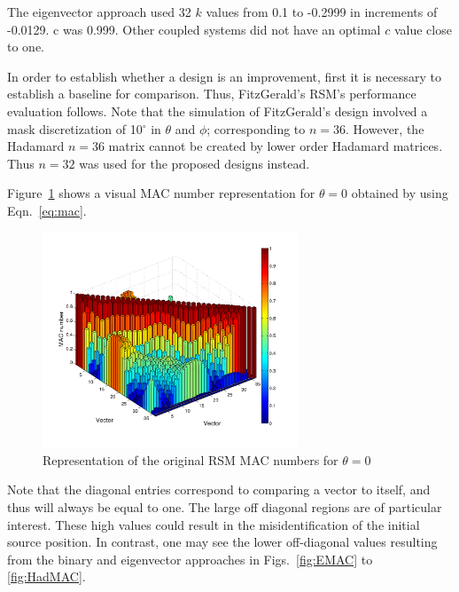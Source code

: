 \documentclass[3p,times]{elsarticle}
\begin{document}
The eigenvector approach used 32 $k$ values from 0.1 to -0.2999 in increments of -0.0129. c was 0.999.  Other coupled systems did not have an optimal 
$c$ value close to one.

In order to establish whether a design is an improvement, first it is necessary to establish a baseline for comparison.  Thus, FitzGerald's RSM's performance evaluation follows.  Note that the 
simulation of FitzGerald's design involved a mask discretization of 10$^\circ$ in $\theta$ and $\phi$; corresponding to $n=36$.  However, the Hadamard $n=36$
matrix cannot be created by lower order Hadamard matrices\cite{Weisstein}.  Thus $n=32$ was used for the proposed designs instead.

Figure~\ref{fig:RSMMAC} shows a visual MAC number representation for $\theta=0$ obtained by using Eqn.~\ref{eq:mac}.  
\begin{figure}[ht!]
\includegraphics[width={3.0in}]{../figs/RSMMAC.pdf}
\centering
\caption{Representation of the original RSM MAC numbers for $\theta=0$}
\label{fig:RSMMAC}
\end{figure}
Note that the diagonal entries correspond to comparing a vector to itself, and thus will always be equal to one.  
The large off diagonal regions are of particular interest.  These high values could result in the misidentification
of the initial source position.  In contrast, one may see the lower off-diagonal values resulting from the binary and eigenvector approaches in Figs.~\ref{fig:EMAC} to \ref{fig:HadMAC}.
\end{document}
